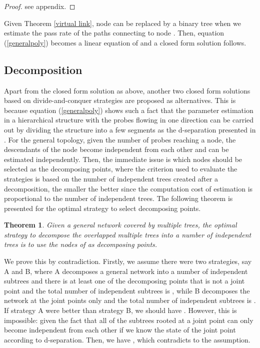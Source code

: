 \documentclass[10pt,twocolumn]{IEEEtran}
\newtheorem{theorem}{\hspace*{1pc}Theorem}
\begin{document}
\begin{proof}
see appendix. \end{proof}

 Given
Theorem \ref{virtual link}, node  can be replaced by a binary tree
when we estimate the pass rate of the paths connecting  to node
. Then, equation (\ref{generalpoly}) becomes a linear equation of
 and a closed form solution follows.

\subsection{Decomposition}

Apart from the closed form solution as above, another two closed form
solutions based on divide-and-conquer strategies are proposed as
alternatives. This is because equation (\ref{generalpoly}) shows such
a fact that the parameter estimation in a hierarchical structure with
the probes flowing in one direction can be carried out by dividing the
structure into a few segments as the d-separation presented in
\cite{JP00}.  For the general topology, given the number of probes
reaching a node, the descendants of the node become independent from
each other and can be estimated independently.  Then, the immediate
issue is which nodes should be selected as the decomposing points,
where the criterion used to evaluate the strategies is based on the
number of independent trees created after a decomposition, the smaller
the better since the computation cost of estimation is proportional to
the number of independent trees. The following theorem is presented
for the optimal strategy to select decomposing points.
\begin{theorem}
Given a general network covered by multiple trees, the optimal
strategy to decompose the overlapped multiple trees into a number of
independent trees is to use the nodes of  as decomposing points.
\end{theorem}
\begin{IEEEproof}
We prove this by contradiction. Firstly, we assume there were two
strategies, say A and B, where A decomposes a general network into a
number of independent subtrees and there is at least one of the
decomposing points that is not a joint point and the total number of
independent subtrees is , while B decomposes the network at the
joint points only and the total number of independent subtrees is .
If strategy A were better than strategy B,  we should have .
However, this is impossible: given the fact that all of the subtrees
rooted at a joint point can only become independent from each other if
we know the state of the joint point according to d-separation. Then,
we have , which contradicts to the assumption.
\end{IEEEproof}
\end{document}
